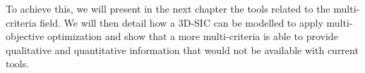 To achieve this, we will present in the next chapter the tools related to the multi-criteria field. We will then detail how a 3D-SIC can be modelled to apply multi-objective optimization and show that a more multi-criteria is able to provide qualitative and quantitative information that would not be available with current tools.

